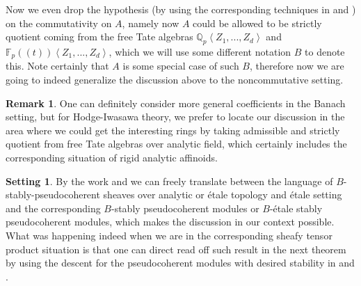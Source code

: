 \documentclass[12pt]{amsart}
\theoremstyle{definition}
\newtheorem{remark}[theorem]{Remark}
\numberwithin{equation}{section}
\newtheorem{setting}[theorem]{Setting}
\begin{document}
\indent Now we even drop the hypothesis (by using the corresponding techniques in \cite{XT3} and \cite{XT4}) on the commutativity on $A$, namely now $A$ could be allowed to be strictly quotient coming from the free Tate algebras $\mathbb{Q}_p\left<Z_1,...,Z_d\right>$ and $\mathbb{F}_p((t))\left<Z_1,...,Z_d\right>$, which we will use some different notation $B$ to denote this. Note certainly that $A$ is some special case of such $B$, therefore now we are going to indeed generalize the discussion above to the noncommutative setting.


\begin{remark}
One can definitely consider more general coefficients in the Banach setting, but for Hodge-Iwasawa theory, we prefer to locate our discussion in the area where we could get the interesting rings by taking admissible and strictly quotient from free Tate algebras over analytic field, which certainly includes the corresponding situation of rigid analytic affinoids.	
\end{remark}



\begin{setting}
By the work \cite{XT3} and \cite{XT4} we can freely translate between the language of $B$-stably-pseudocoherent sheaves over analytic or \'etale topology and \'etale setting and the corresponding $B$-stably pseudocoherent modules or $B$-\'etale stably pseudocoherent modules, which makes the discussion in our context possible. What was happening indeed when we are in the corresponding sheafy tensor product situation is that one can direct read off such result in the next theorem by using the descent for the pseudocoherent modules with desired stability in \cite{KL2} and \cite{Ked1}.  	
\end{setting}
 
\end{document}
